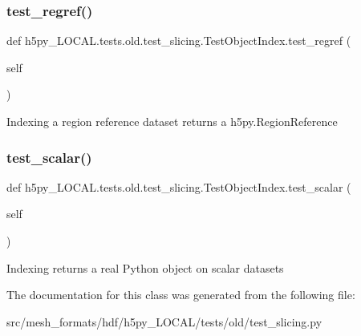 \subsubsection{\texorpdfstring{test\+\_\+regref()}{test\_regref()}}
{\footnotesize\ttfamily def h5py\+\_\+\+L\+O\+C\+A\+L.\+tests.\+old.\+test\+\_\+slicing.\+Test\+Object\+Index.\+test\+\_\+regref (\begin{DoxyParamCaption}\item[{}]{self }\end{DoxyParamCaption})}

\begin{DoxyVerb}Indexing a region reference dataset returns a h5py.RegionReference
\end{DoxyVerb}
 \mbox{\label{classh5py__LOCAL_1_1tests_1_1old_1_1test__slicing_1_1TestObjectIndex_a95d8259abcf4dd98fa4a37cd928858bc}} 
\subsubsection{\texorpdfstring{test\+\_\+scalar()}{test\_scalar()}}
{\footnotesize\ttfamily def h5py\+\_\+\+L\+O\+C\+A\+L.\+tests.\+old.\+test\+\_\+slicing.\+Test\+Object\+Index.\+test\+\_\+scalar (\begin{DoxyParamCaption}\item[{}]{self }\end{DoxyParamCaption})}

\begin{DoxyVerb}Indexing returns a real Python object on scalar datasets \end{DoxyVerb}
 

The documentation for this class was generated from the following file\+:\begin{DoxyCompactItemize}
\item 
src/mesh\+\_\+formats/hdf/h5py\+\_\+\+L\+O\+C\+A\+L/tests/old/test\+\_\+slicing.\+py\end{DoxyCompactItemize}
